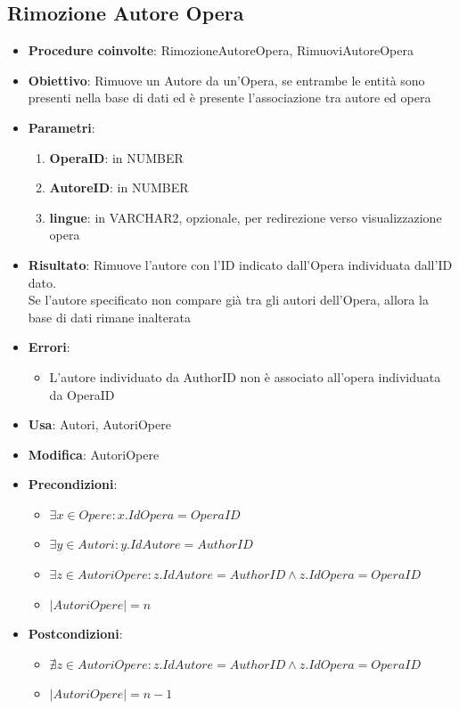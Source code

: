 \label{RimozioneAutoreOpera}
\subsection{Rimozione Autore Opera}
\begin{itemize}
	\item \textbf{Procedure coinvolte}: RimozioneAutoreOpera, RimuoviAutoreOpera
	\item \textbf{Obiettivo}: Rimuove un Autore da un'Opera, se entrambe le entità sono presenti nella base di dati ed è presente l'associazione tra autore ed opera
	\item \textbf{Parametri}:
	\begin{enumerate}
		\item \textbf{OperaID}: in NUMBER
		\item \textbf{AutoreID}: in NUMBER
		\item \textbf{lingue}: in VARCHAR2, opzionale, per redirezione verso visualizzazione opera
	\end{enumerate}
	\item \textbf{Risultato}: Rimuove l'autore con l'ID indicato dall'Opera individuata dall'ID dato.\\
	Se l'autore specificato non compare già tra gli autori dell'Opera, allora la base di dati rimane inalterata
	\item \textbf{Errori}:
	\begin{itemize}
		\item L'autore individuato da AuthorID non è associato all'opera individuata da OperaID
	\end{itemize}
	\item \textbf{Usa}: Autori, AutoriOpere
	\item \textbf{Modifica}: AutoriOpere
	\item \textbf{Precondizioni}:
	\begin{itemize}
		\item $\exists x \in Opere : x.IdOpera = OperaID$
		\item $\exists y \in Autori : y.IdAutore = AuthorID$
		\item $\exists z \in AutoriOpere : z.IdAutore = AuthorID \land z.IdOpera = OperaID$
		\item $|AutoriOpere| = n$
	\end{itemize}
	\item \textbf{Postcondizioni}:
	\begin{itemize}
		\item $\nexists z \in AutoriOpere : z.IdAutore = AuthorID \land z.IdOpera = OperaID$
		\item $|AutoriOpere| = n - 1$\\
	\end{itemize}
\end{itemize}

